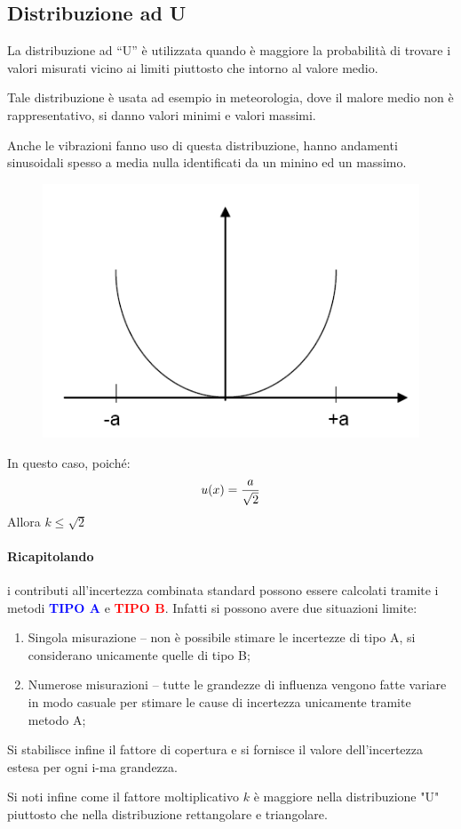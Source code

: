 \documentclass[a4paper, 15pt]{article}
\begin{document}
\subsection{Distribuzione ad U}
\begin{adjustwidth}{2in}{}  		 
  		 La distribuzione ad “U” è utilizzata quando è maggiore la probabilità di trovare
  		 i valori misurati vicino ai limiti piuttosto che intorno al valore medio.
  		 
  		 Tale distribuzione è usata ad esempio in meteorologia, dove il malore medio non è rappresentativo, si danno valori minimi e valori massimi. 
  		 
  		 Anche le vibrazioni fanno uso di questa distribuzione, hanno andamenti sinusoidali spesso a media nulla identificati da un minino ed un massimo.  	
  		 \begin{figure}[H]
  		 	\centering
  		 	\includegraphics[width=0.5\linewidth]{fig/screenshot004}
  		 	\label{fig:screenshot004}
  		 \end{figure}  		   		 
  		 In questo caso, poiché:
  		 \[u(x) = {a\over\sqrt{2}}\]  
  		 Allora $k\leq\sqrt{2}$
\paragraph{Ricapitolando} i contributi all’incertezza combinata standard possono essere calcolati tramite
  		 i metodi \textcolor{blue}{\textbf{TIPO A}} e \textcolor{red}{\textbf{TIPO B}}. Infatti si possono avere due situazioni limite:
  		 \begin{enumerate}
  		 	\item Singola misurazione – non è possibile stimare le incertezze di tipo A, si considerano
  		 	unicamente quelle di tipo B;
  		 	\item Numerose misurazioni – tutte le grandezze di influenza vengono fatte variare in
  		 	modo casuale per stimare le cause di incertezza unicamente tramite metodo A;
  		\end{enumerate}
  		Si stabilisce infine il fattore di copertura e si fornisce il valore dell’incertezza estesa
  		per ogni i-ma grandezza.
  		
  		Si noti infine come il fattore moltiplicativo $k$ è maggiore nella distribuzione "U" piuttosto che nella distribuzione rettangolare e triangolare. \newline 
\end{adjustwidth}
\newpage
\end{document}
